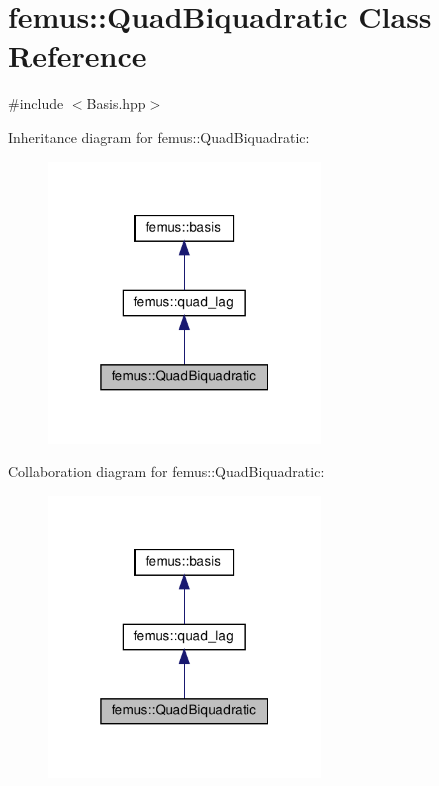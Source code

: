 \hypertarget{classfemus_1_1_quad_biquadratic}{}\section{femus\+:\+:Quad\+Biquadratic Class Reference}
\label{classfemus_1_1_quad_biquadratic}


{\ttfamily \#include $<$Basis.\+hpp$>$}



Inheritance diagram for femus\+:\+:Quad\+Biquadratic\+:
\nopagebreak
\begin{figure}[H]
\begin{center}
\leavevmode
\includegraphics[width=205pt]{classfemus_1_1_quad_biquadratic__inherit__graph}
\end{center}
\end{figure}


Collaboration diagram for femus\+:\+:Quad\+Biquadratic\+:
\nopagebreak
\begin{figure}[H]
\begin{center}
\leavevmode
\includegraphics[width=205pt]{classfemus_1_1_quad_biquadratic__coll__graph}
\end{center}
\end{figure}
